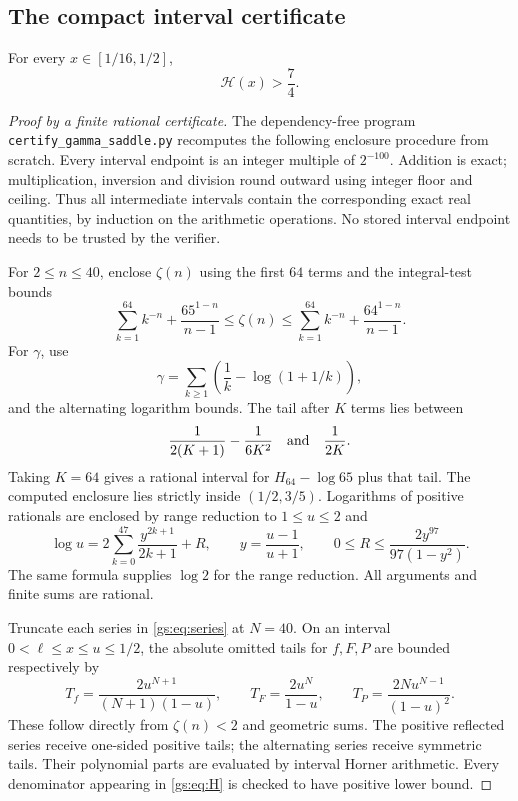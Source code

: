 \subsection{The compact interval certificate}

\begin{lemma}\label{gs:lem:certificate}
For every $x\in[1/16,1/2]$,
\[
 \mathcal H(x)>\frac74.
\]
\end{lemma}

\begin{proof}[Proof by a finite rational certificate]
The dependency-free program \texttt{certify\_gamma\_saddle.py}
recomputes the following enclosure procedure from scratch.
Every interval endpoint is an integer multiple of $2^{-100}$.
Addition is exact; multiplication, inversion and division round
outward using integer floor and ceiling. Thus all intermediate
intervals contain the corresponding exact real quantities, by induction
on the arithmetic operations. No stored interval endpoint needs to be
trusted by the verifier.

For $2\le n\le40$, enclose $\zeta(n)$ using the first $64$ terms
and the integral-test bounds
\[
 \sum_{k=1}^{64}k^{-n}+
       \frac{65^{1-n}}{n-1}
 \le\zeta(n)\le
 \sum_{k=1}^{64}k^{-n}+
       \frac{64^{1-n}}{n-1}.
\]
For $\gamma$, use
\[
 \gamma=\sum_{k\ge1}\left(\frac1k-\log(1+1/k)\right),
\]
and the alternating logarithm bounds. The tail after $K$ terms lies
between
\[
 \frac1{2(K+1)}-\frac1{6K^2}
 \quad\hbox{and}\quad\frac1{2K}.
\]
Taking $K=64$ gives a rational interval for
$H_{64}-\log65$ plus that tail. The computed enclosure lies strictly
inside $(1/2,3/5)$. Logarithms of positive rationals are enclosed by
range reduction to $1\le u\le2$ and
\[
 \log u=2\sum_{k=0}^{47}\frac{y^{2k+1}}{2k+1}+R,
 \qquad y=\frac{u-1}{u+1},\qquad
 0\le R\le\frac{2y^{97}}{97(1-y^2)}.
\]
The same formula supplies $\log2$ for the range reduction.
All arguments and finite sums are rational.

Truncate each series in \eqref{gs:eq:series} at $N=40$. On an interval
$0<\ell\le x\le u\le1/2$, the absolute omitted tails for $f,F,P$
are bounded respectively by
\begin{equation}\label{gs:eq:tail-bounds}
 T_f=\frac{2u^{N+1}}{(N+1)(1-u)},\qquad
 T_F=\frac{2u^N}{1-u},\qquad
 T_P=\frac{2Nu^{N-1}}{(1-u)^2}.
\end{equation}
These follow directly from $\zeta(n)<2$ and geometric sums.
The positive reflected series receive one-sided positive tails;
the alternating series receive symmetric tails. Their polynomial
parts are evaluated by interval Horner arithmetic. Every denominator
appearing in \eqref{gs:eq:H} is checked to have positive lower bound.


\end{proof}
